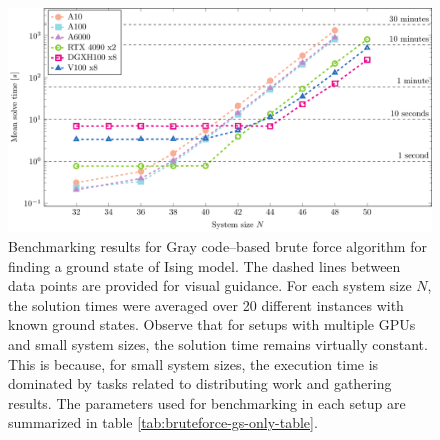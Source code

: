 \begin{figure}
  \includegraphics[width=\textwidth]{figures/bf_benchmarks_initial}
  \caption{
    Benchmarking results for Gray code--based brute force algorithm for finding a
    ground state of Ising model. The dashed lines between data points are provided
    for visual guidance. For each system size $N$, the solution times were averaged
    over 20 different instances with known ground states. Observe that for setups
    with multiple GPUs and small system sizes, the solution time remains virtually
    constant. This is because, for small system sizes, the execution time is
    dominated by tasks related to distributing work and gathering results. The
    parameters used for benchmarking in each setup are summarized in table
    \ref{tab:bruteforce-gs-only-table}. } \label{fig:bruteforce-gsonly-benchmarks}
\end{figure}

